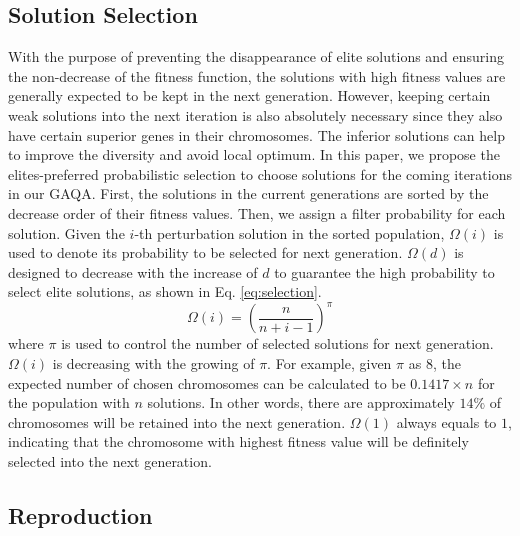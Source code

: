 \documentclass[lettersize,journal]{IEEEtran}
\begin{document}
	\subsection{Solution Selection}
	With the purpose of preventing the disappearance of elite solutions and ensuring the non-decrease of the fitness function, the solutions with high fitness values are generally expected to be kept in the next generation. However, keeping certain weak solutions into the next iteration is also absolutely necessary since they also have certain superior genes in their chromosomes. The inferior solutions can help to improve the diversity and avoid local optimum. In this paper, we propose the elites-preferred probabilistic selection to choose solutions for the coming iterations in our GAQA. First, the solutions in the current generations are sorted by the decrease order of their fitness values. Then, we assign a filter probability for each solution. Given the $i$-th perturbation solution in the sorted population, $\Omega(i)$ is used to denote its probability to be selected for next generation.  $\Omega(d)$ is designed to decrease with the increase of $d$ to guarantee the high probability to select elite solutions, as shown in Eq. \ref{eq:selection}.
	\begin{equation}
		\label{eq:selection}
		\Omega(i)=(\frac{n}{n+i-1})^\pi
	\end{equation}
	where $\pi$ is used to control the number of selected solutions for next generation. $\Omega(i)$ is decreasing with the growing of $\pi$. For example, given $\pi$ as $8$, the expected number of chosen chromosomes can be calculated to be $0.1417 \times n$ for the population with $n$ solutions. In other words, there are approximately $14\%$ of chromosomes will be retained into the next generation. $\Omega(1)$ always equals to $1$, indicating that the chromosome with highest fitness value will be definitely selected into the next generation.
	
	
	
	\subsection{Reproduction}
\end{document}
